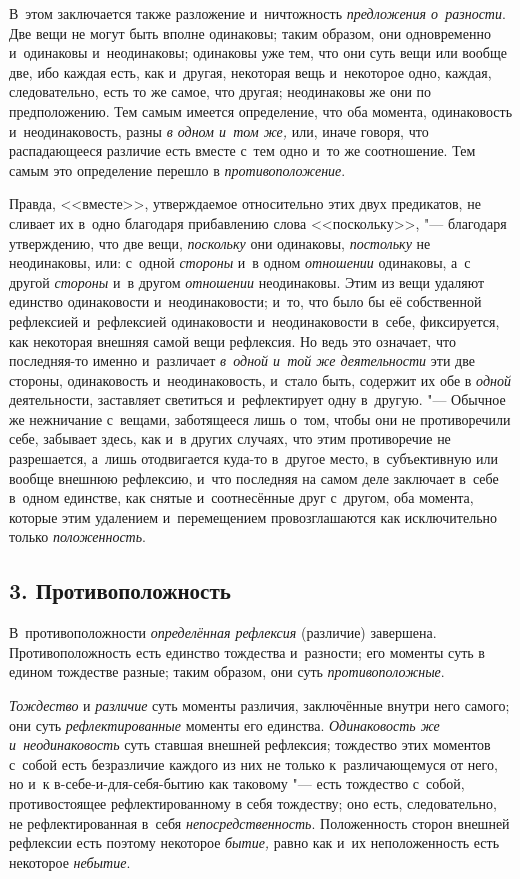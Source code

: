 В~этом заключается также разложение и~ничтожность{\em
предложения о~разности}. Две вещи не могут быть вполне одинаковы; таким
образом, они одновременно и~одинаковы и~неодинаковы; одинаковы уже тем, что
они суть вещи или вообще две, ибо каждая есть, как и~другая, некоторая вещь
и~некоторое одно, каждая, следовательно, есть то же самое, что другая;
неодинаковы же они по предположению. Тем самым имеется определение, что оба
момента, одинаковость и~неодинаковость, разны {\em в
одном и~том же,} или, иначе говоря, что распадающееся различие есть вместе
с~тем одно и~то же соотношение. Тем самым это определение перешло в
{\em противоположение}.

Правда, <<вместе>>, утверждаемое относительно этих двух предикатов, не сливает
их в~одно благодаря прибавлению слова <<поскольку>>, "--- благодаря
утверждению, что две вещи, {\em поскольку} они
одинаковы, {\em постольку} не неодинаковы, или: с~одной
{\em стороны} и~в одном {\em отношении} одинаковы, а~с другой
{\em стороны} и~в другом {\em отношении} неодинаковы. Этим из вещи удаляют
единство одинаковости и~неодинаковости; и~то, что было бы её собственной
рефлексией и~рефлексией одинаковости и~неодинаковости в~себе, фиксируется,
как некоторая внешняя самой вещи рефлексия. Но ведь это означает, что
последняя-то именно и~различает {\em в~одной и~той же
деятельности} эти две стороны, одинаковость и~неодинаковость, и~стало быть,
содержит их обе в {\em одной} деятельности, заставляет
светиться и~рефлектирует одну в~другую. "--- Обычное же нежничание с~вещами,
заботящееся лишь о~том, чтобы они не противоречили себе, забывает здесь,
как и~в других случаях, что этим противоречие не разрешается, а~лишь
отодвигается куда-то в~другое место, в~субъективную или вообще внешнюю
рефлексию, и~что последняя на самом деле заключает в~себе в~одном единстве,
как снятые и~соотнесённые друг с~другом, оба момента, которые этим
удалением и~перемещением провозглашаются как исключительно только
{\em положенность}.


\subsection[3. Противоположность]{3. Противоположность}
В~противоположности {\em определённая рефлексия} (различие) завершена.
Противоположность есть единство тождества и~разности; его моменты суть в
едином тождестве разные; таким образом, они суть {\em противоположные}.

{\em Тождество} и {\em различие}
суть моменты различия, заключённые внутри него самого; они суть
{\em рефлектированные} моменты его единства.
{\em Одинаковость же и~неодинаковость} суть ставшая
внешней рефлексия; тождество этих моментов с~собой есть безразличие каждого
из них не только к~различающемуся от него, но и~к в-себе-и-для-себя-бытию
как таковому "--- есть тождество с~собой, противостоящее рефлектированному в
себя тождеству; оно есть, следовательно, не рефлектированная в~себя
{\em непосредственность}. Положенность сторон внешней
рефлексии есть поэтому некоторое {\em бытие,} равно как
и~их неположенность есть некоторое {\em небытие}.

